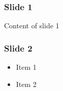 \documentclass[english,svgnames,notes=hide,14pt,aspectratio=169]{beamer}
\title{\large\presentationtitle}
\author{\textcolor{srscolor}{\textbf{$<$Name$>$ \\
		\small {\textcolor{srscolor2} {Supervised by $<$Name$>$ }}\\
		\small {\textcolor{srscolor2} {$<$University$>$ }}
}}}
\date{}
\begin{document}
\thispagestyle{empty}
\begin{frame}
  \titlepage
\end{frame}




\begin{frame}
	\frametitle{Slide 1}

	Content of slide 1 
\end{frame}


\begin{frame}
	\frametitle{Slide 2}

	\begin{itemize}
		\item Item 1
		\item Item 2
	\end{itemize}
\end{frame}



\begin{frame}
\thispagestyle{empty}
	\thispagestyle{last-page}
\end{frame}
\end{document}
